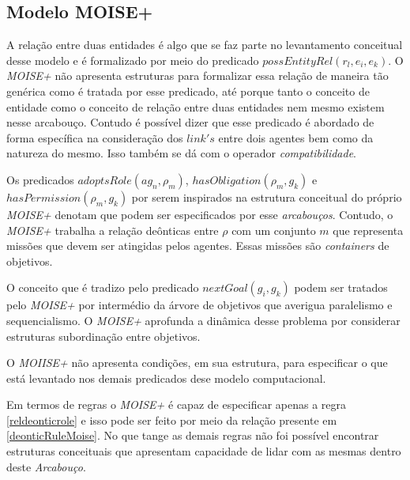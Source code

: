 \subsection{Modelo MOISE+}

A relação entre duas entidades é algo que se faz parte no levantamento conceitual desse modelo e é formalizado por meio do predicado $possEntityRel(r_l,e_i,e_k)$. O \textit{MOISE+} não apresenta estruturas para formalizar essa relação de maneira tão genérica como é tratada por esse predicado, até porque tanto o conceito de entidade como o conceito de relação entre duas entidades nem mesmo existem nesse arcabouço. Contudo é possível dizer que esse predicado é abordado de forma específica na consideração dos $link's$ entre dois agentes bem como da natureza do mesmo. Isso também se dá com o operador \textit{compatibilidade}. 

Os predicados $adoptsRole(ag_n,\rho_m)$, $hasObligation(\rho_m,g_k)$ e $hasPermission(\rho_m,g_k)$ por serem inspirados na estrutura conceitual do próprio \textit{MOISE+} denotam que podem ser especificados por esse \textit{arcabouços}. Contudo, o \textit{MOISE+} trabalha a relação deônticas entre $\rho$ com um conjunto $m$ que representa missões que devem ser atingidas pelos agentes. Essas missões são \textit{containers} de objetivos.

O conceito que é tradizo pelo predicado $nextGoal(g_i,g_k)$ podem ser tratados pelo \textit{MOISE+} por intermédio da árvore de objetivos que averigua paralelismo e sequencialismo. O \textit{MOISE+} aprofunda a dinâmica desse problema por considerar estruturas subordinação entre objetivos. 

O \textit{MOIISE+} não apresenta condições, em sua estrutura, para especificar o que está levantado nos demais predicados dese modelo computacional. 

Em termos de regras o \textit{MOISE+} é capaz de especificar apenas a regra \ref{reldeonticrole} e isso pode ser feito por meio da relação presente em \ref{deonticRuleMoise}. No que tange as demais regras não foi possível encontrar estruturas conceituais que apresentam capacidade de lidar com as mesmas dentro deste \textit{Arcabouço}.  